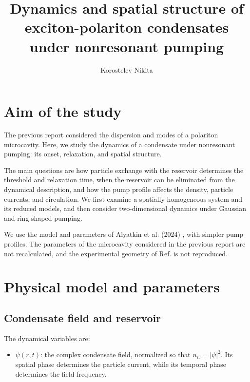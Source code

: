 \documentclass[12pt,a4paper]{article}
\title{Dynamics and spatial structure of exciton-polariton condensates under nonresonant pumping}
\author{Korostelev Nikita}
\date{}
\begin{document}
\maketitle
\clearpage


\clearpage

\clearpage

\clearpage

\clearpage

\section{Aim of the study}\label{sec:1}

The previous report considered the dispersion and modes of a polariton microcavity. Here, we study the dynamics of a condensate under nonresonant pumping: its onset, relaxation, and spatial structure.

The main questions are how particle exchange with the reservoir determines the threshold and relaxation time, when the reservoir can be eliminated from the dynamical description, and how the pump profile affects the density, particle currents, and circulation. We first examine a spatially homogeneous system and its reduced models, and then consider two-dimensional dynamics under Gaussian and ring-shaped pumping.

We use the model and parameters of Alyatkin et al. (2024) \cite{ref3}, with simpler pump profiles. The parameters of the microcavity considered in the previous report are not recalculated, and the experimental geometry of Ref. \cite{ref3} is not reproduced.

\clearpage

\section{Physical model and parameters}\label{sec:2}

\subsection{Condensate field and reservoir}\label{sec:2.1}

The dynamical variables are:

\begin{itemize}\setlength{\itemsep}{3pt}\item $\psi(r,t)$: the complex condensate field, normalized so that $n_{C}=|\psi|^2$. Its spatial phase determines the particle current, while its temporal phase determines the field frequency.\end{itemize}
\end{document}
